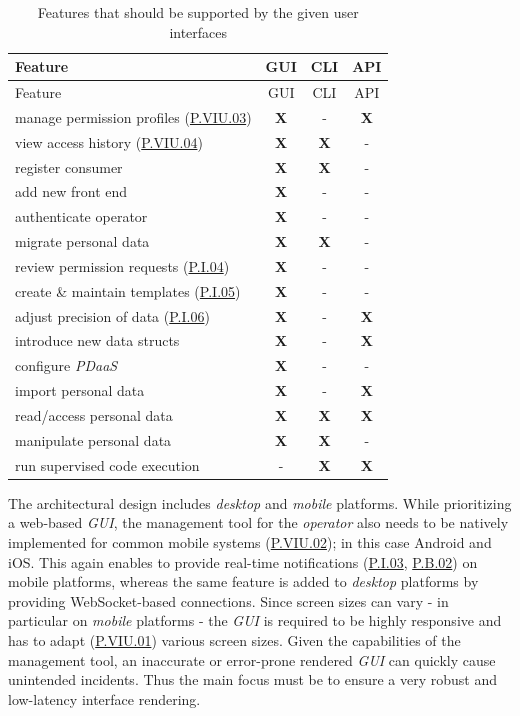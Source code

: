 \documentclass[12pt,english,a4paper,titlepage,cleardoublepage=empty,dottedtoc]{report}
\begin{document}
\begin{longtable}[]{@{}lccc@{}}
\caption{Features that should be supported by the given user interfaces
\label{tbl:ui-features}}\tabularnewline
\toprule
Feature & GUI & CLI & API\tabularnewline
\midrule
\endfirsthead
\toprule
Feature & GUI & CLI & API\tabularnewline
\midrule
\endhead
manage permission profiles (\protect\hyperlink{pviu03}{P.VIU.03}) &
\textbf{X} & - & \textbf{X}\tabularnewline
view access history (\protect\hyperlink{pviu04}{P.VIU.04}) & \textbf{X}
& \textbf{X} & -\tabularnewline
register consumer & \textbf{X} & \textbf{X} & -\tabularnewline
add new front end & \textbf{X} & - & -\tabularnewline
authenticate operator & \textbf{X} & - & -\tabularnewline
migrate personal data & \textbf{X} & \textbf{X} & -\tabularnewline
review permission requests (\protect\hyperlink{pi04}{P.I.04}) &
\textbf{X} & - & -\tabularnewline
create \& maintain templates (\protect\hyperlink{pi05}{P.I.05}) &
\textbf{X} & - & -\tabularnewline
adjust precision of data (\protect\hyperlink{pi06}{P.I.06}) & \textbf{X}
& - & \textbf{X}\tabularnewline
introduce new data structs & \textbf{X} & - & \textbf{X}\tabularnewline
configure \emph{PDaaS} & \textbf{X} & - & -\tabularnewline
import personal data & \textbf{X} & - & \textbf{X}\tabularnewline
read/access personal data & \textbf{X} & \textbf{X} &
\textbf{X}\tabularnewline
manipulate personal data & \textbf{X} & \textbf{X} & -\tabularnewline
run supervised code execution & - & \textbf{X} &
\textbf{X}\tabularnewline
\bottomrule
\end{longtable}

The architectural design includes \emph{desktop} and \emph{mobile}
platforms. While prioritizing a web-based \emph{GUI}, the management
tool for the \emph{operator} also needs to be natively implemented for
common mobile systems (\protect\hyperlink{pviu02}{P.VIU.02}); in this
case Android and iOS. This again enables to provide real-time
notifications (\protect\hyperlink{pi03}{P.I.03},
\protect\hyperlink{pb02}{P.B.02}) on mobile platforms, whereas the same
feature is added to \emph{desktop} platforms by providing
WebSocket-based connections. Since screen sizes can vary - in particular
on \emph{mobile} platforms - the \emph{GUI} is required to be highly
responsive and has to adapt (\protect\hyperlink{pviu01}{P.VIU.01})
various screen sizes. Given the capabilities of the management tool, an
inaccurate or error-prone rendered \emph{GUI} can quickly cause
unintended incidents. Thus the main focus must be to ensure a very
robust and low-latency interface rendering.
\end{document}

